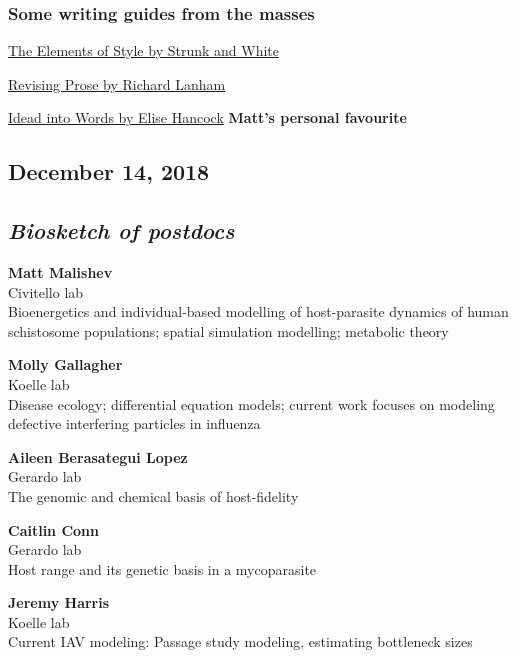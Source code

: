\documentclass[10,portrait]{article}
\begin{document}
\subsubsection{Some writing guides from the
masses}\label{some-writing-guides-from-the-masses}

\href{https://www.amazon.com/Elements-Style-William-Strunk-Jr/dp/194564401X}{The
Elements of Style by Strunk and White}

\href{http://people.vetmed.wsu.edu/jmgay/courses/documents/TheParamedicMethod.pdf}{Revising
Prose by Richard Lanham}

\href{https://www.amazon.com/Ideas-into-Words-Mastering-Science/dp/0801873304/ref=pd_sim_b_1}{Idead
into Words by Elise Hancock} \textbf{Matt's personal favourite}

\newpage    

\subsection{December 14, 2018}\label{december-14-2018}

\subsection{\texorpdfstring{\emph{Biosketch of
postdocs}}{Biosketch of postdocs}}\label{biosketch-of-postdocs}

\textbf{Matt Malishev}\\
Civitello lab\\
Bioenergetics and individual-based modelling of host-parasite dynamics
of human schistosome populations; spatial simulation modelling;
metabolic theory

\textbf{Molly Gallagher}\\
Koelle lab\\
Disease ecology; differential equation models; current work focuses on
modeling defective interfering particles in influenza

\textbf{Aileen Berasategui Lopez}\\
Gerardo lab\\
The genomic and chemical basis of host-fidelity

\textbf{Caitlin Conn}\\
Gerardo lab\\
Host range and its genetic basis in a mycoparasite

\textbf{Jeremy Harris}\\
Koelle lab\\
Current IAV modeling: Passage study modeling, estimating bottleneck
sizes
\end{document}
